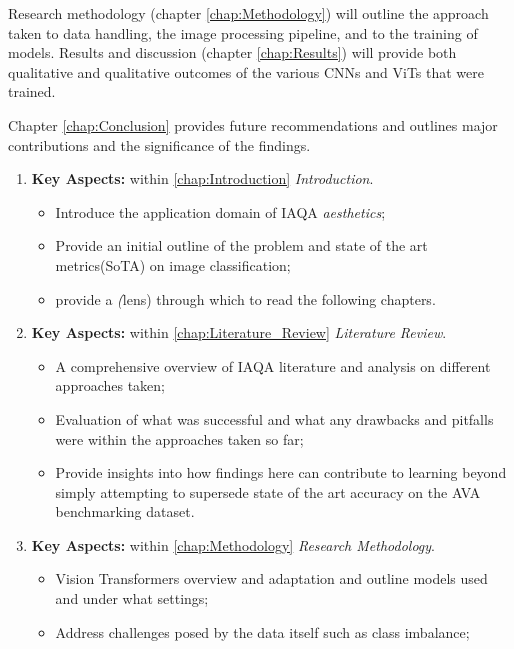 \par

Research methodology (chapter \ref{chap:Methodology}) will outline the approach taken to data handling, the image processing pipeline, and to the training of models. Results and discussion (chapter \ref{chap:Results}) will provide both qualitative and qualitative outcomes of the various CNNs and ViTs that were trained. 

\par Chapter \ref{chap:Conclusion} provides future recommendations and outlines major contributions and the significance of the findings.

\newpage

\begin{enumerate}
 \item \textbf{Key Aspects:} within \ref{chap:Introduction} \emph{Introduction}.
        \begin{itemize}
            \item Introduce the application domain of IAQA \emph{aesthetics};
            \item Provide an initial outline of the problem and state of the art metrics(SoTA) on image classification;
            \item provide a \emph(lens) through which to read the following chapters. 
        \end{itemize}
 \item \textbf{Key Aspects:} within \ref{chap:Literature_Review} \emph{Literature Review}.
        \begin{itemize}
            \item A comprehensive overview of IAQA literature and analysis on different approaches taken;
            \item Evaluation of what was successful and what any drawbacks and pitfalls were within the approaches taken so far;
            \item Provide insights into how findings here can contribute to learning beyond simply attempting to supersede state of the art accuracy on the AVA benchmarking dataset. 
        \end{itemize}
    \item \textbf{Key Aspects:} within \ref{chap:Methodology} \emph{Research Methodology}.
        \begin{itemize}
        \item Vision Transformers overview and adaptation and outline models used and under what settings;
        \item Address challenges posed by the data itself such as class imbalance;

\end{itemize}
\end{enumerate}
